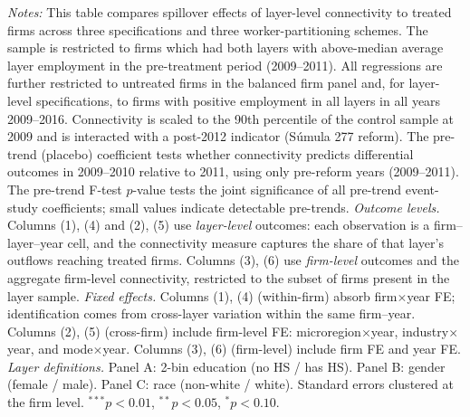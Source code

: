 \begin{table}[H]
\begin{threeparttable}
\begin{tablenotes}[flushleft]
\item \textit{Notes:} This table compares spillover effects of layer-level connectivity to treated firms across three specifications and three worker-partitioning schemes. The sample is restricted to firms which had both layers with above-median average layer employment in the pre-treatment period (2009--2011). All regressions are further restricted to untreated firms in the balanced firm panel and, for layer-level specifications, to firms with positive employment in all layers in all years 2009--2016. Connectivity is scaled to the 90th percentile of the control sample at 2009 and is interacted with a post-2012 indicator (S\'{u}mula 277 reform). The pre-trend (placebo) coefficient tests whether connectivity predicts differential outcomes in 2009--2010 relative to 2011, using only pre-reform years (2009--2011). The pre-trend F-test $p$-value tests the joint significance of all pre-trend event-study coefficients; small values indicate detectable pre-trends. \textit{Outcome levels.} Columns (1), (4) and (2), (5) use \textit{layer-level} outcomes: each observation is a firm--layer--year cell, and the connectivity measure captures the share of that layer's outflows reaching treated firms. Columns (3), (6) use \textit{firm-level} outcomes and the aggregate firm-level connectivity, restricted to the subset of firms present in the layer sample. \textit{Fixed effects.} Columns (1), (4) (within-firm) absorb firm$\times$year FE; identification comes from cross-layer variation within the same firm--year. Columns (2), (5) (cross-firm) include firm-level FE: microregion$\times$year, industry$\times$year, and mode$\times$year. Columns (3), (6) (firm-level) include firm FE and year FE. \textit{Layer definitions.} Panel A: 2-bin education (no HS / has HS). Panel B: gender (female / male). Panel C: race (non-white / white). Standard errors clustered at the firm level. $^{***}p<0.01$, $^{**}p<0.05$, $^{*}p<0.10$.
\end{tablenotes}
\end{threeparttable}
\end{table}